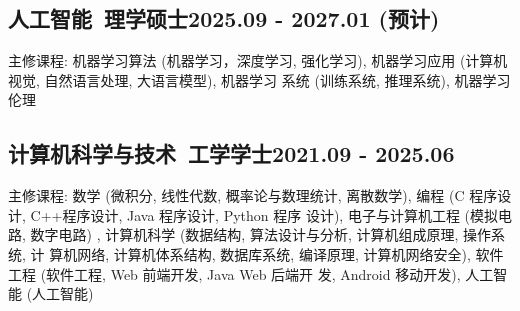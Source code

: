 \vspace*{10pt}
\subsection {{人工智能\ 理学硕士}\hfill 2025.09 - 2027.01 (预计)}
\vspace*{5pt}
主修课程: 机器学习算法 (机器学习，深度学习, 强化学习),  机器学习应用 (计算机视觉, 自然语言处理, 大语言模型), 机器学习
系统 (训练系统, 推理系统), 机器学习伦理

\vspace*{6pt}
\subsection{{计算机科学与技术\ 工学学士}\hfill 2021.09 - 2025.06}
\vspace*{5pt}
主修课程: 数学 (微积分, 线性代数, 概率论与数理统计, 离散数学), 编程 (C 程序设计, C++程序设计, Java 程序设计, Python 程序
设计), 电子与计算机工程 (模拟电路, 数字电路) , 计算机科学 (数据结构, 算法设计与分析, 计算机组成原理, 操作系统, 计
算机网络, 计算机体系结构, 数据库系统, 编译原理, 计算机网络安全), 软件工程 (软件工程, Web 前端开发, Java Web 后端开
发, Android 移动开发), 人工智能 (人工智能)
